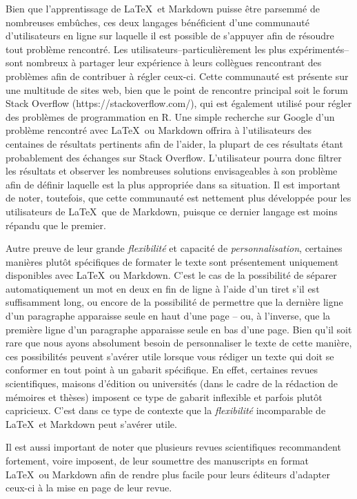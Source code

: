 \documentclass[
  letterpaper,
  DIV=11,
  numbers=noendperiod]{scrreprt}
\begin{document}
Bien que l'apprentissage de \LaTeX~et Markdown puisse être parsemmé de
nombreuses embûches, ces deux langages bénéficient d'une communauté
d'utilisateurs en ligne sur laquelle il est possible de s'appuyer afin
de résoudre tout problème rencontré. Les utilisateurs--particulièrement
les plus expérimentés--sont nombreux à partager leur expérience à leurs
collègues rencontrant des problèmes afin de contribuer à régler ceux-ci.
Cette communauté est présente sur une multitude de sites web, bien que
le point de rencontre principal soit le forum Stack Overflow
(https://stackoverflow.com/), qui est également utilisé pour régler des
problèmes de programmation en R. Une simple recherche sur Google d'un
problème rencontré avec \LaTeX~ou Markdown offrira à l'utilisateurs des
centaines de résultats pertinents afin de l'aider, la plupart de ces
résultats étant probablement des échanges sur Stack Overflow.
L'utilisateur pourra donc filtrer les résultats et observer les
nombreuses solutions envisageables à son problème afin de définir
laquelle est la plus appropriée dans sa situation. Il est important de
noter, toutefois, que cette communauté est nettement plus développée
pour les utilisateurs de \LaTeX~que de Markdown, puisque ce dernier
langage est moins répandu que le premier.

Autre preuve de leur grande \emph{flexibilité} et capacité de
\emph{personnalisation}, certaines manières plutôt spécifiques de
formater le texte sont présentement uniquement disponibles avec
\LaTeX~ou Markdown. C'est le cas de la possibilité de séparer
automatiquement un mot en deux en fin de ligne à l'aide d'un tiret s'il
est suffisamment long, ou encore de la possibilité de permettre que la
dernière ligne d'un paragraphe apparaisse seule en haut d'une page --
ou, à l'inverse, que la première ligne d'un paragraphe apparaisse seule
en bas d'une page. Bien qu'il soit rare que nous ayons absolument besoin
de personnaliser le texte de cette manière, ces possibilités peuvent
s'avérer utile lorsque vous rédiger un texte qui doit se conformer en
tout point à un gabarit spécifique. En effet, certaines revues
scientifiques, maisons d'édition ou universités (dans le cadre de la
rédaction de mémoires et thèses) imposent ce type de gabarit inflexible
et parfois plutôt capricieux. C'est dans ce type de contexte que la
\emph{flexibilité} incomparable de \LaTeX~et Markdown peut s'avérer
utile.

Il est aussi important de noter que plusieurs revues scientifiques
recommandent fortement, voire imposent, de leur soumettre des
manuscripts en format \LaTeX~ou Markdown afin de rendre plus facile pour
leurs éditeurs d'adapter ceux-ci à la mise en page de leur revue.
\end{document}
